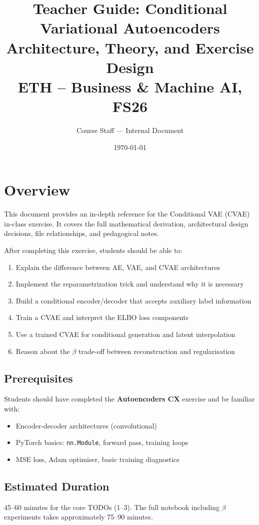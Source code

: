 \documentclass[11pt,a4paper]{article}
\title{\textbf{Teacher Guide: Conditional Variational Autoencoders}\\[0.5em]
       \large Architecture, Theory, and Exercise Design\\[0.3em]
       \normalsize ETH -- Business \& Machine AI, FS26}
\author{Course Staff --- Internal Document}
\date{\today}
\begin{document}
\maketitle
\tableofcontents
\newpage

\section{Overview}

This document provides an in-depth reference for the Conditional VAE (CVAE) in-class exercise. It covers the full mathematical derivation, architectural design decisions, file relationships, and pedagogical notes.

\begin{concept}
After completing this exercise, students should be able to:
\begin{enumerate}
    \item Explain the difference between AE, VAE, and CVAE architectures
    \item Implement the reparametrization trick and understand why it is necessary
    \item Build a conditional encoder/decoder that accepts auxiliary label information
    \item Train a CVAE and interpret the ELBO loss components
    \item Use a trained CVAE for conditional generation and latent interpolation
    \item Reason about the $\beta$ trade-off between reconstruction and regularisation
\end{enumerate}
\end{concept}

\subsection{Prerequisites}
Students should have completed the \textbf{Autoencoders CX} exercise and be familiar with:
\begin{itemize}
    \item Encoder-decoder architectures (convolutional)
    \item PyTorch basics: \texttt{nn.Module}, forward pass, training loops
    \item MSE loss, Adam optimiser, basic training diagnostics
\end{itemize}

\subsection{Estimated Duration}
45--60 minutes for the core TODOs (1--3). The full notebook including $\beta$ experiments takes approximately 75--90 minutes.
\end{document}
